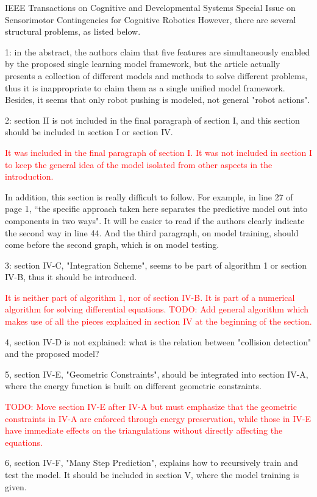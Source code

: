 \documentclass[a4paper,12pt]{letter}
\newcommand{\comment}[1]{\textcolor{red}{#1}}
\begin{document}
\begin{letter}{IEEE Transactions on Cognitive and Developmental Systems\newline
Special Issue on Sensorimotor Contingencies for Cognitive Robotics}
However, there are several structural problems, as listed below. 

1: in the abstract, the authors claim that five features are simultaneously enabled by the proposed single learning model framework, but the article actually presents a collection of different models and methods to solve different problems, thus it is inappropriate to claim them as a single unified model framework. Besides, it seems that only robot pushing is modeled, not general "robot actions". 

2: section II is not included in the final paragraph of section I, and this section should be included in section I or section IV.

\comment{It was included in the final paragraph of section I.  It was not included in section I to keep the general idea of the model isolated from other aspects in the introduction.}

In addition, this section is really difficult to follow. For example, in line 27 of page 1, “the specific approach taken here separates the predictive model out into components in two ways". It will be easier to read if the authors clearly indicate the second way in line 44. And the third paragraph, on model training, should come before the second graph, which is on model testing. 

3: section IV-C, "Integration Scheme", seems to be part of algorithm 1 or section IV-B, thus it should be introduced.

\comment{It is neither part of algorithm 1, nor of section IV-B.  It is part of a numerical algorithm for solving differential equations. \newline TODO: Add general algorithm which makes use of all the pieces explained in section IV at the beginning of the section.}

4, section IV-D is not explained: what is the relation between "collision detection" and the proposed model? 

5, section IV-E, "Geometric Constraints", should be integrated into section IV-A, where the energy function is built on different geometric constraints.

\comment{TODO: Move section IV-E after IV-A but must emphasize that the geometric constraints in IV-A are enforced through energy preservation, while those in IV-E have immediate effects on the triangulations without directly affecting the equations.}

6, section IV-F, "Many Step Prediction", explains how to recursively train and test the model. It should be included in section V, where the model training is given.


\end{letter}
\end{document}
